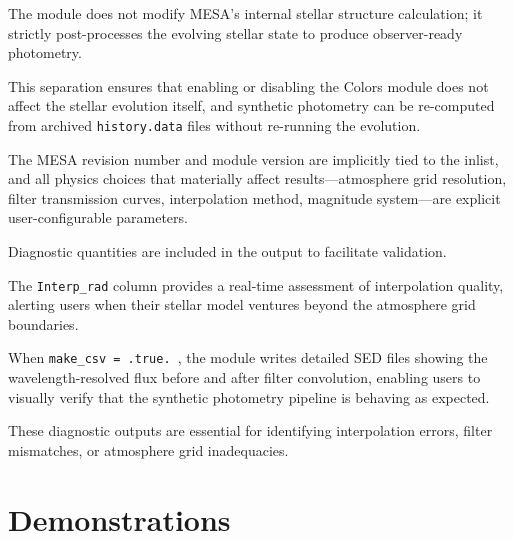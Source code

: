\documentclass[linenumbers,apj,twocolumn, floatfix]{aastex701}
\begin{document}
The module does not modify MESA's internal stellar structure calculation; it strictly post-processes the evolving stellar state to produce observer-ready photometry.

This separation ensures that enabling or disabling the Colors module does not affect the stellar evolution itself, and synthetic photometry can be re-computed from archived \texttt{history.data} files without re-running the evolution.

The MESA revision number and module version are implicitly tied to the inlist, and all physics choices that materially affect results—atmosphere grid resolution, filter transmission curves, interpolation method, magnitude system—are explicit user-configurable parameters.

Diagnostic quantities are included in the output to facilitate validation.

The \texttt{Interp\_rad} column provides a real-time assessment of interpolation quality, alerting users when their stellar model ventures beyond the atmosphere grid boundaries.

When \texttt{make\_csv = .true.
}, the module writes detailed SED files showing the wavelength-resolved flux before and after filter convolution, enabling users to visually verify that the synthetic photometry pipeline is behaving as expected.

These diagnostic outputs are essential for identifying interpolation errors, filter mismatches, or atmosphere grid inadequacies.

\section{Demonstrations}
\label{sec:demonstrations}
\end{document}
